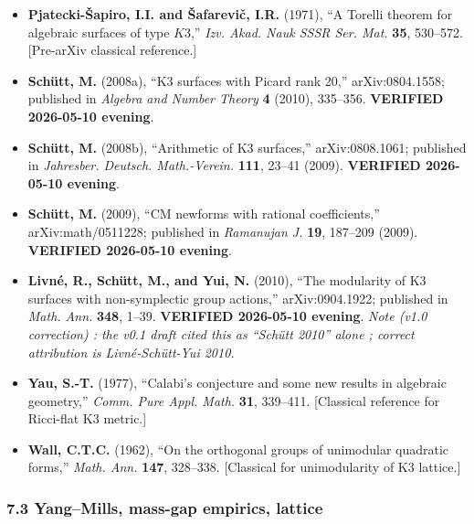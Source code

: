 \documentclass[
  11pt,
  a4paper,
]{article}
\begin{document}
\begin{itemize}
\item
  \textbf{Pjatecki-Šapiro, I.I. and Šafarevič, I.R.} (1971), ``A Torelli theorem for algebraic surfaces of type \(K3\),'' \emph{Izv. Akad. Nauk SSSR Ser. Mat.} \textbf{35}, 530--572. {[}Pre-arXiv classical reference.{]}
\item
  \textbf{Schütt, M.} (2008a), ``K3 surfaces with Picard rank 20,'' arXiv:0804.1558; published in \emph{Algebra and Number Theory} \textbf{4} (2010), 335--356. \textbf{VERIFIED 2026-05-10 evening}.
\item
  \textbf{Schütt, M.} (2008b), ``Arithmetic of K3 surfaces,'' arXiv:0808.1061; published in \emph{Jahresber. Deutsch. Math.-Verein.} \textbf{111}, 23--41 (2009). \textbf{VERIFIED 2026-05-10 evening}.
\item
  \textbf{Schütt, M.} (2009), ``CM newforms with rational coefficients,'' arXiv:math/0511228; published in \emph{Ramanujan J.} \textbf{19}, 187--209 (2009). \textbf{VERIFIED 2026-05-10 evening}.
\item
  \textbf{Livné, R., Schütt, M., and Yui, N.} (2010), ``The modularity of K3 surfaces with non-symplectic group actions,'' arXiv:0904.1922; published in \emph{Math. Ann.} \textbf{348}, 1--39. \textbf{VERIFIED 2026-05-10 evening}. \emph{Note (v1.0 correction) : the v0.1 draft cited this as ``Schütt 2010'' alone ; correct attribution is Livné-Schütt-Yui 2010.}
\item
  \textbf{Yau, S.-T.} (1977), ``Calabi's conjecture and some new results in algebraic geometry,'' \emph{Comm. Pure Appl. Math.} \textbf{31}, 339--411. {[}Classical reference for Ricci-flat K3 metric.{]}
\item
  \textbf{Wall, C.T.C.} (1962), ``On the orthogonal groups of unimodular quadratic forms,'' \emph{Math. Ann.} \textbf{147}, 328--338. {[}Classical for unimodularity of K3 lattice.{]}
\end{itemize}

\hypertarget{yangmills-mass-gap-empirics-lattice}{%
\subsubsection{7.3 Yang--Mills, mass-gap empirics, lattice}\label{yangmills-mass-gap-empirics-lattice}}
\end{document}
